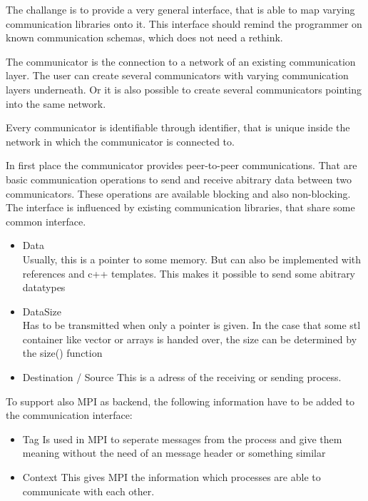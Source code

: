 The challange is to provide a very general interface, that is able to
map varying communication libraries onto it. This interface should
remind the programmer on known communication schemas, which does
not need a rethink.

The communicator is the connection to a network of an existing 
communication layer. The user can create several communicators
with varying communication layers underneath. Or it is also 
possible to create several communicators pointing into the
same network.

Every communicator is identifiable through identifier, that is
unique inside the network in which the communicator is connected to.

In first place the communicator provides peer-to-peer communications. That
are basic communication operations to send and receive abitrary data between 
two communicators. These operations are available blocking and also non-blocking.
The interface is influenced by existing communication libraries, that
share some common interface.

\begin{itemize}
  \item Data \\
    Usually, this is a pointer to some memory.
    But can also be implemented with references and c++ templates.
    This makes it possible to send some abitrary datatypes
  \item DataSize\\
    Has to be transmitted when only a pointer is given. In the
    case that some stl container like vector or arrays is 
    handed over, the size can be determined by the size() function
  \item Destination / Source
    This is a adress of the receiving or sending process.
    
\end{itemize}

To support also MPI as backend, the following information have to be
added to the communication interface:

\begin{itemize}
  \item Tag
    Is used in MPI to seperate messages from the process and give them
    meaning without the need of an message header or something similar
  \item Context
    This gives MPI the information which processes are able to communicate
    with each other.
    
\end{itemize}

